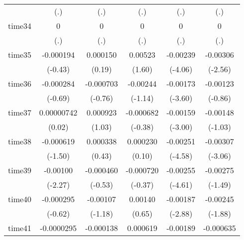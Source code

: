\begin{table}[htbp]
\begin{tabular}{l*{5}{c}}
            &         (.)         &         (.)         &         (.)         &         (.)         &         (.)         \\
time34      &           0         &           0         &           0         &           0         &           0         \\
            &         (.)         &         (.)         &         (.)         &         (.)         &         (.)         \\
time35      &   -0.000194         &    0.000150         &     0.00523         &    -0.00239\sym{***}&    -0.00306\sym{*}  \\
            &     (-0.43)         &      (0.19)         &      (1.60)         &     (-4.06)         &     (-2.56)         \\
time36      &   -0.000284         &   -0.000703         &    -0.00244         &    -0.00173\sym{***}&    -0.00123         \\
            &     (-0.69)         &     (-0.76)         &     (-1.14)         &     (-3.60)         &     (-0.86)         \\
time37      &  0.00000742         &    0.000923         &   -0.000682         &    -0.00159\sym{**} &    -0.00148         \\
            &      (0.02)         &      (1.03)         &     (-0.38)         &     (-3.00)         &     (-1.03)         \\
time38      &   -0.000619         &    0.000338         &    0.000230         &    -0.00251\sym{***}&    -0.00307\sym{**} \\
            &     (-1.50)         &      (0.43)         &      (0.10)         &     (-4.58)         &     (-3.06)         \\
time39      &    -0.00100\sym{*}  &   -0.000460         &   -0.000720         &    -0.00255\sym{***}&    -0.00275         \\
            &     (-2.27)         &     (-0.53)         &     (-0.37)         &     (-4.61)         &     (-1.49)         \\
time40      &   -0.000295         &    -0.00107         &     0.00140         &    -0.00187\sym{**} &    -0.00245         \\
            &     (-0.62)         &     (-1.18)         &      (0.65)         &     (-2.88)         &     (-1.88)         \\
time41      &  -0.0000295         &   -0.000138         &    0.000619         &    -0.00189\sym{**} &   -0.000635         \\

\end{tabular}
\end{table}
